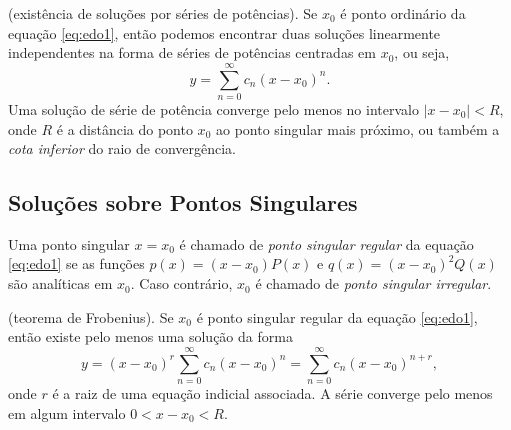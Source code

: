 \documentclass{article}
\begin{document}
\begin{thm} (existência de soluções por séries de potências).
    Se \(x_0\) é ponto ordinário da equação \eqref{eq:edo1}, então podemos encontrar duas soluções linearmente independentes na forma de séries de potências centradas em \(x_0\), ou seja,
    \[
    y = \sum_{n=0}^{\infty} c_n (x - x_0)^n.
    \]
    Uma solução de série de potência converge pelo menos no intervalo \(|x - x_0| < R\), onde \(R\) é a distância do ponto \(x_0\) ao ponto singular mais próximo, ou também a \emph{cota inferior} do raio de convergência.
\end{thm}

\subsection{Soluções sobre Pontos Singulares}

\begin{defn}
    Uma ponto singular \(x=x_0\) é chamado de \emph{ponto singular regular} da equação \eqref{eq:edo1} se as funções \(p(x)=(x-x_0)P(x)\) e \(q(x)=(x-x_0)^2Q(x)\) são analíticas em \(x_0\). Caso contrário, \(x_0\) é chamado de \emph{ponto singular irregular}.
\end{defn}

\begin{thm} (teorema de Frobenius).
    Se \(x_0\) é ponto singular regular da equação \eqref{eq:edo1}, então existe pelo menos uma solução da forma
    \begin{equation}
        y = (x - x_0)^r \sum_{n=0}^{\infty} c_n (x - x_0)^n = \sum_{n=0}^{\infty} c_n (x - x_0)^{n+r},
    \end{equation}
    \noindent onde \(r\) é a raiz de uma equação indicial associada. A série converge pelo menos em algum intervalo \(0<x-x_0<R\).
\end{thm}
\end{document}
